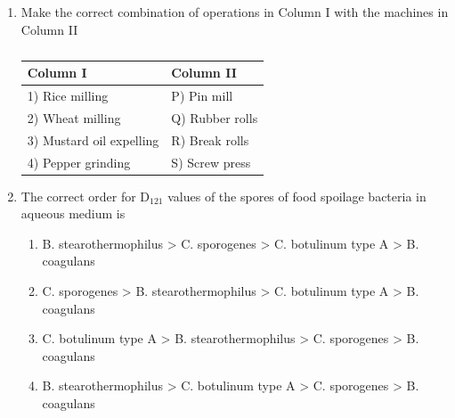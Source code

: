 \documentclass[a4paper,10pt]{article}
\begin{document}
\begin{enumerate}
    \hfill{}
    
    \item Make the correct combination of operations in Column I with the machines in Column II
    \begin{table}[h!] \centering \caption*{} \label{tab:q11_food}
        \begin{tabular}{ll} \hline
            \textbf{Column I} & \textbf{Column II} \\ \hline
            1) Rice milling & P) Pin mill \\
            2) Wheat milling & Q) Rubber rolls \\
            3) Mustard oil expelling & R) Break rolls \\
            4) Pepper grinding & S) Screw press \\ \hline
        \end{tabular}
    \end{table}
    
    \hfill{}
    \begin{enumerate}
    \end{enumerate}

    \item The correct order for D$_{121}$ values of the spores of food spoilage bacteria in aqueous medium is
    
    \hfill{}
    \begin{enumerate}
        \item B. stearothermophilus > C. sporogenes > C. botulinum type A > B. coagulans
        \item C. sporogenes > B. stearothermophilus > C. botulinum type A > B. coagulans
        \item C. botulinum type A > B. stearothermophilus > C. sporogenes > B. coagulans
        \item B. stearothermophilus > C. botulinum type A > C. sporogenes > B. coagulans
    \end{enumerate}
    

\end{enumerate}
\end{document}
